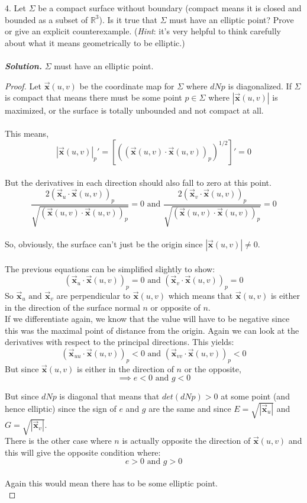 \documentclass[11pt,letterpaper]{article}
\begin{document}
4. Let $\Sigma$ be a compact surface without boundary (compact means it is closed and bounded as a subset of $\mathbb{R}^3$).  Is it true that $\Sigma$ must have an elliptic point? Prove or give an explicit counterexample. (\textit{Hint}: it's very helpful to think carefully about what it means geometrically to be elliptic.)
\\
\\
\textbf{\textit{Solution.}} $\Sigma$ must have an elliptic point.
\begin{proof}
Let $\vec{\mathbf{x}}(u,v)$ be the coordinate map for $\Sigma$ where $dNp$ is diagonalized. If $\Sigma$ is compact that means there must be some point $p\in\Sigma$ where $|\vec{\mathbf{x}}(u,v)|$ is maximized, or the surface is totally unbounded and not compact at all.
\\
\\
This means,
\[
|\vec{\mathbf{x}}(u,v)|_p'=[\left((\vec{\mathbf{x}}(u,v)\cdot\vec{\mathbf{x}}(u,v))_p\right)^{1/2}]'=0
\]
\\
But the derivatives in each direction should also fall to zero at this point.
\[
\frac{2(\vec{\mathbf{x}}_u\cdot\vec{\mathbf{x}}(u,v))_p}{\sqrt{(\vec{\mathbf{x}}(u,v)\cdot\vec{\mathbf{x}}(u,v))_p}}=0
\textrm{ and } 
\frac{2(\vec{\mathbf{x}}_v\cdot\vec{\mathbf{x}}(u,v))_p}{\sqrt{(\vec{\mathbf{x}}(u,v)\cdot\vec{\mathbf{x}}(u,v))_p}}=0
\]
\\
So, obviously, the surface can't just be the origin since $|\vec{\mathbf{x}}(u,v)|\neq0$.
\\
\\
The previous equations can be simplified slightly to show:
\[
(\vec{\mathbf{x}}_u\cdot\vec{\mathbf{x}}(u,v))_p=0 \textrm{ and } (\vec{\mathbf{x}}_v\cdot\vec{\mathbf{x}}(u,v))_p=0
\]
So $\vec{\mathbf{x}}_u \textrm{ and } \vec{\mathbf{x}}_v$ are perpendicular to $\vec{\mathbf{x}}(u,v)$ which means that $\vec{\mathbf{x}}(u,v)$ is either in the direction of the surface normal $n$ or opposite of $n$.
\\
If we differentiate again, we know that the value will have to be negative since this was the maximal point of distance from the origin.  Again we can look at the derivatives with respect to the principal directions.  This yields:
\\
\[
(\vec{\mathbf{x}}_{uu}\cdot\vec{\mathbf{x}}(u,v))_p<0 \textrm{ and } (\vec{\mathbf{x}}_{vv}\cdot\vec{\mathbf{x}}(u,v))_p<0
\]
But since $\vec{\mathbf{x}}(u,v)$ is either in the direction of $n$ or the opposite,
\[
\implies e<0 \textrm{ and } g<0
\]

But since $dNp$ is diagonal that means that $det(dNp)>0$ at some point (and hence elliptic) since the sign of $e$ and $g$ are the same and since $E=\sqrt{|\vec{\mathbf{x}}_u|}$ and $G=\sqrt{|\vec{\mathbf{x}}_v|}$.
\\
There is the other case where $n$ is actually opposite the direction of $\vec{\mathbf{x}}(u,v)$ and this will give the opposite condition where:
\[
e>0 \textrm{ and } g>0
\]
\\
Again this would mean there has to be some elliptic point.
\\
\end{proof}
\end{document}
